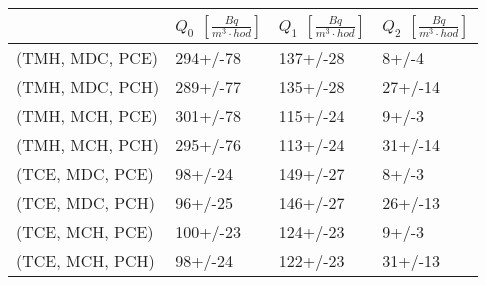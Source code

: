 \begin{tabular}{llll}
\toprule
{} & $Q_0$ $\left[\si{\frac{Bq}{m^3\cdot hod}}\right]$ & $Q_1$ $\left[\si{\frac{Bq}{m^3\cdot hod}}\right]$ & $Q_2$ $\left[\si{\frac{Bq}{m^3\cdot hod}}\right]$ \\
\midrule
(TMH, MDC, PCE) &                                          294+/-78 &                                          137+/-28 &                                             8+/-4 \\
(TMH, MDC, PCH) &                                          289+/-77 &                                          135+/-28 &                                           27+/-14 \\
(TMH, MCH, PCE) &                                          301+/-78 &                                          115+/-24 &                                             9+/-3 \\
(TMH, MCH, PCH) &                                          295+/-76 &                                          113+/-24 &                                           31+/-14 \\
(TCE, MDC, PCE) &                                           98+/-24 &                                          149+/-27 &                                             8+/-3 \\
(TCE, MDC, PCH) &                                           96+/-25 &                                          146+/-27 &                                           26+/-13 \\
(TCE, MCH, PCE) &                                          100+/-23 &                                          124+/-23 &                                             9+/-3 \\
(TCE, MCH, PCH) &                                           98+/-24 &                                          122+/-23 &                                           31+/-13 \\
\bottomrule
\end{tabular}
